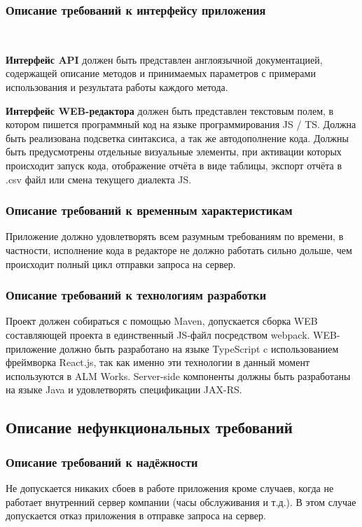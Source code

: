\documentclass[12pt]{article}
\begin{document}
    \subsubsection{Описание требований к интерфейсу приложения}~

    \textbf{Интерфейс API} должен быть представлен англоязычной документацией, содержащей описание методов и
    принимаемых параметров с примерами использования и результата работы каждого метода.

    \textbf{Интерфейс WEB-редактора} должен быть представлен текстовым полем, в котором пишется программный код на языке
    программирования JS / TS. Должна быть реализована подсветка синтаксиса, а так же автодополнение кода. Должны быть предусмотрены
    отдельные визуальные элементы, при активации которых происходит запуск кода, отображение отчёта в виде таблицы, экспорт
    отчёта в .csv файл или смена текущего диалекта JS.

    \subsubsection{Описание требований к временным характеристикам}
    Приложение должно удовлетворять всем разумным требованиям по времени, в частности, исполнение кода в редакторе не должно
    работать сильно дольше, чем происходит полный цикл отправки запроса на сервер.

    \subsubsection{Описание требований к технологиям разработки}
    Проект должен собираться с помощью Maven, допускается сборка WEB составляющей проекта в единственный JS-файл посредством webpack.
    WEB-приложение должно быть разработано на языке TypeScript c использованием фреймворка React.js, так как именно эти технологии в
    данный момент используются в ALM Works. Server-side компоненты должны быть разработаны на языке Java и удовлетворять спецификации
    JAX-RS.

    \subsection{Описание нефункциональных требований}

    \subsubsection{Описание требований к надёжности}
    Не допускается никаких сбоев в работе приложения кроме случаев, когда не работает внутренний сервер компании
    (часы обслуживания и т.д.). В этом случае допускается отказ приложения в отправке запроса на сервер.
\end{document}
